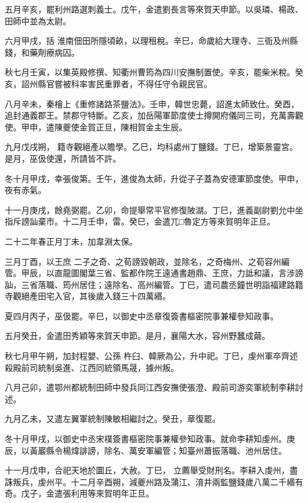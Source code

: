 \begin{pinyinscope}
 五月辛亥，罷利州路選刺義士。戊午，金遣劉長言等來賀天申節。以吳璘、楊政、田師中並為太尉。



 六月甲戌，括
 淮南佃田所隱頃畝，以理租稅。辛巳，命歲給大理寺、三衙及州縣錢，和藥劑療病囚。



 秋七月壬寅，以集英殿修撰、知衢州曹筠為四川安撫制置使。辛亥，罷柴米稅。癸亥，詔州縣官嘗被科率害民重罪者，不得任守令親民官。



 八月辛未，秦檜上《重修諸路茶鹽法》。壬申，韓世忠薨，詔進太師致仕。癸酉，追封通義郡王。禁郡守特斷。乙亥，加岳陽軍節度使士撙開府儀同三司，充萬壽觀使。甲申，遣陳夔使金賀正旦，陳相賀金主生辰。



 九月戊戌朔，
 籍寺觀絕產以贍學。乙巳，均科處州丁鹽錢。丁巳，增築景靈宮。是月，巫伋使還，所請皆不許。



 冬十月甲戌，幸張俊第。壬午，進俊為太師，升從子子蓋為安德軍節度使。甲申，夜有赤氣。



 十一月庚戌，餘堯弼罷。乙卯，命提舉常平官修復陂湖。丁巳，進義副尉劉允中坐指斥謗訕棄市。十二月壬申，雷。癸巳，金遣兀□魯定方等來賀明年正旦。



 二十二年春正月丁未，加韋淵太保。



 三月丁酉，以王庶
 二子之奇、之荀謗毀朝政，並除名，之奇梅州、之荀容州編管。甲辰，以直龍圖閣葉三省、監都作院王遠通書趙鼎、王庶，力詆和議，言涉謗訕，三省落職、筠州居住；遠除名、高州編管。丁巳，遣司農丞鐘世明詣福建路籍寺觀絕產田宅入官，其後歲入錢三十四萬緡。



 夏四月丙子，巫伋罷。辛巳，以御史中丞章復簽書樞密院事兼權參知政事。



 五月癸丑，金遣田秀穎等來賀天申節。是月，襄陽大水，容州野蠶成繭。



 秋七月甲午朔，加封程嬰、公孫
 杵臼、韓厥為公，升中祀。丁巳，虔州軍卒齊述殺殿前司統制吳進、江西同統領馬晟，據州叛。



 八月己卯，遣鄂州都統制田師中發兵同江西安撫使張澄、殿前司游奕軍統制李耕討述。



 九月乙未，又遣左翼軍統制陳敏相繼討之。癸丑，章復罷。



 冬十月甲戌，以御史中丞宋樸簽書樞密院事兼權參知政事。就命李耕知虔州。庚辰，以黃巖縣令楊煒誹謗，除名、萬安軍編管；知臺州蕭振落職、池州居住。



 十一月戊申，合祀天地於圜丘，大赦。丁巳，
 立薦舉受財刑名。李耕入虔州，盡誅叛兵，虔州平。十二月辛酉朔，減夔州路及蒲江、淯井兩監鹽錢歲八萬二千緡有奇。戊子，金遣張利用等來賀明年正旦。



\end{pinyinscope}